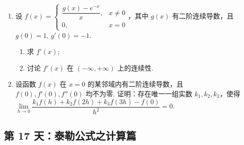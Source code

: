 \newpage

\begin{enumerate}[label=\textbf{\arabic*.}, itemsep=6cm, resume]
    \item 设 $f(x) = \begin{cases} \dfrac{g(x) - e^{-x}}{x}, & x \ne 0 \\ 0, & x=0 \end{cases}$，其中 $g(x)$ 有二阶连续导数，且 $g(0)=1$, $g'(0)=-1$.
    \begin{enumerate}[label=(\arabic*)]
        \item 求 $f'(x)$;
        \item 讨论 $f'(x)$ 在 $(-\infty,+\infty)$ 上的连续性.
    \end{enumerate}
    
    \item 设函数 $f(x)$ 在 $x=0$ 的某邻域内有二阶连续导数，且 $f(0), f'(0), f''(0)$ 均不为零. 证明：存在唯一一组实数 $k_1,k_2,k_3$，使得
    $ \lim\limits_{h \to 0} \dfrac{k_1f(h) + k_2f(2h) + k_3f(3h) - f(0)}{h^2} = 0. $
\end{enumerate}

\newpage

\subsection*{第 17 天：泰勒公式之计算篇}
\vspace{1cm}

